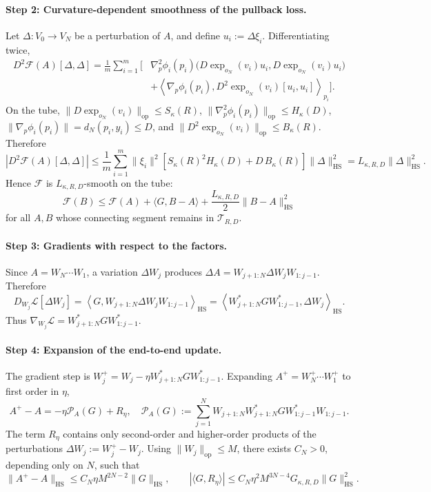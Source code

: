 \documentclass[letterpaper]{article}
\begin{document}
\paragraph{Step 2: Curvature-dependent smoothness of the pullback loss.}
Let \(\Delta:V_0\to V_N\) be a perturbation of \(A\), and define
\(u_i:=\Delta \xi_i\). Differentiating twice,
\[
\begin{aligned}
D^2\mathcal F(A)[\Delta,\Delta]
=
\frac1m\sum_{i=1}^m
\Big[
&\nabla_p^2\phi_i(p_i)
\big(D\exp_{o_N}(v_i)u_i, D\exp_{o_N}(v_i)u_i\big)
\\
&+ \left\langle \nabla_p\phi_i(p_i),
D^2\exp_{o_N}(v_i)[u_i,u_i] \right\rangle_{p_i}
\Big].
\end{aligned}
\]
On the tube, \(\|D\exp_{o_N}(v_i)\|_{\mathrm{op}} \leq S_\kappa(R)\),
\(\|\nabla_p^2\phi_i(p_i)\|_{\mathrm{op}} \leq H_\kappa(D)\),
\(\|\nabla_p\phi_i(p_i)\| = d_N(p_i,y_i) \leq D\),
and \(\|D^2\exp_{o_N}(v_i)\|_{\mathrm{op}} \leq B_\kappa(R)\).
Therefore
\[
|D^2\mathcal F(A)[\Delta,\Delta]|
\leq
\frac1m\sum_{i=1}^m \|\xi_i\|^2
\left[S_\kappa(R)^2H_\kappa(D) + D\,B_\kappa(R)\right]
\|\Delta\|_{\mathrm{HS}}^2
=
L_{\kappa,R,D} \|\Delta\|_{\mathrm{HS}}^2.
\]
Hence \(\mathcal F\) is \(L_{\kappa,R,D}\)-smooth on the tube:
\[
\mathcal F(B)
\leq
\mathcal F(A)
+
\langle G,B-A\rangle
+
\frac{L_{\kappa,R,D}}2 \|B-A\|_{\mathrm{HS}}^2
\]
for all \(A,B\) whose connecting segment remains in \(\mathcal T_{R,D}\).

\paragraph{Step 3: Gradients with respect to the factors.}
Since \(A=W_N\cdots W_1\), a variation \(\Delta W_j\) produces
\(\Delta A = W_{j+1:N}\Delta W_jW_{1:j-1}\). Therefore
\[
D_{W_j}\mathcal L[\Delta W_j]
=
\left\langle G, W_{j+1:N}\Delta W_jW_{1:j-1} \right\rangle_{\mathrm{HS}}
=
\left\langle W_{j+1:N}^*GW_{1:j-1}^*, \Delta W_j \right\rangle_{\mathrm{HS}}.
\]
Thus \(\nabla_{W_j}\mathcal L = W_{j+1:N}^*GW_{1:j-1}^*.\)

\paragraph{Step 4: Expansion of the end-to-end update.}
The gradient step is \(W_j^+ = W_j - \eta W_{j+1:N}^*GW_{1:j-1}^*\).
Expanding \(A^+=W_N^+\cdots W_1^+\) to first order in \(\eta\),
\[
A^+-A = -\eta \mathcal P_A(G) + R_\eta,
\quad
\mathcal P_A(G)
:=
\sum_{j=1}^N
W_{j+1:N}W_{j+1:N}^* G W_{1:j-1}^*W_{1:j-1}.
\]
The term \(R_\eta\) contains only second-order and higher-order products
of the perturbations \(\Delta W_j:=W_j^+-W_j\). Using
\(\|W_j\|_{\mathrm{op}}\leq M\), there exists \(C_N>0\), depending only on
\(N\), such that
\[
\|A^+-A\|_{\mathrm{HS}} \leq C_N\eta M^{2N-2}\|G\|_{\mathrm{HS}},
\qquad
|\langle G,R_\eta\rangle|
\leq
C_N\eta^2M^{3N-4}G_{\kappa,R,D} \|G\|_{\mathrm{HS}}^2.
\]
\end{document}
